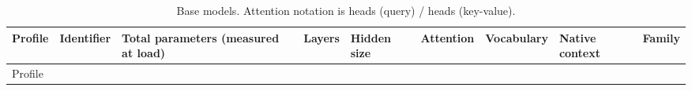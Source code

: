 \begin{landscape}
\begingroup\scriptsize\setlength{\tabcolsep}{1pt}\sloppy
\begin{longtable}[]{@{}
  >{\raggedright\arraybackslash}p{}
  >{\raggedright\arraybackslash}p{}
  >{\raggedleft\arraybackslash}p{}
  >{\raggedleft\arraybackslash}p{}
  >{\raggedleft\arraybackslash}p{}
  >{\raggedright\arraybackslash}p{}
  >{\raggedleft\arraybackslash}p{}
  >{\raggedleft\arraybackslash}p{}
  >{\raggedright\arraybackslash}p{}@{}}
\caption{Base models. Attention notation is heads (query) / heads (key-value).}\tabularnewline
\toprule\noalign{}
\begin{minipage}[b]{\linewidth}\raggedright
Profile
\end{minipage} & \begin{minipage}[b]{\linewidth}\raggedright
Identifier
\end{minipage} & \begin{minipage}[b]{\linewidth}\raggedleft
Total parameters (measured at load)
\end{minipage} & \begin{minipage}[b]{\linewidth}\raggedleft
Layers
\end{minipage} & \begin{minipage}[b]{\linewidth}\raggedleft
Hidden size
\end{minipage} & \begin{minipage}[b]{\linewidth}\raggedright
Attention
\end{minipage} & \begin{minipage}[b]{\linewidth}\raggedleft
Vocabulary
\end{minipage} & \begin{minipage}[b]{\linewidth}\raggedleft
Native context
\end{minipage} & \begin{minipage}[b]{\linewidth}\raggedright
Family
\end{minipage} \\
\midrule\noalign{}
\endfirsthead
\toprule\noalign{}
\begin{minipage}[b]{\linewidth}\raggedright
Profile
\end{minipage} & \begin{minipage}[b]{\linewidth}\raggedright

\end{minipage}
\end{longtable}
\end{landscape}
